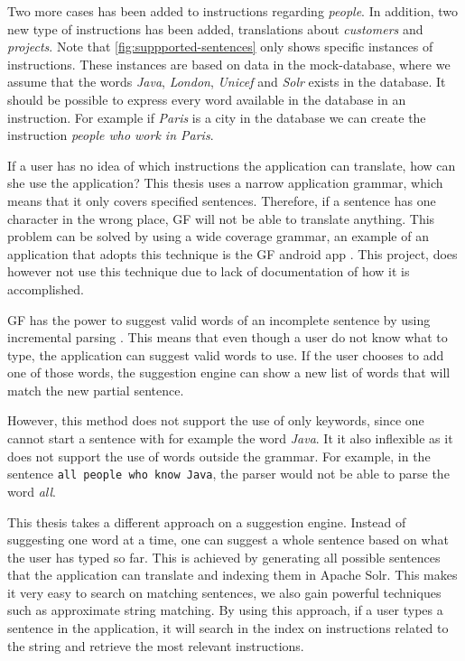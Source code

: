 Two more cases has been added to instructions regarding \emph{people}. In addition, two new type of instructions has been added, translations about \emph{customers} and \emph{projects}. Note that \autoref{fig:suppported-sentences} only shows specific instances of instructions. These instances are based on data in the mock-database, where we assume that the words \emph{Java}, \emph{London}, \emph{Unicef} and \emph{Solr} exists in the database. It should be possible to express every word available in the database in an instruction. For example if \emph{Paris} is a city in the database we can create the instruction \emph{people who work in Paris}.

If a user has no idea of which instructions the application can translate, how can she use the application? This thesis uses a narrow application grammar, which means that it only covers specified sentences. Therefore, if a sentence has one character in the wrong place, GF will not be able to
translate anything. This problem can be solved by using a wide coverage grammar, an example of an application that adopts this technique is the GF android app \cite[p. 41]{angelov2014speech}. This project, does however not use this technique due to lack of documentation of how it is accomplished.

GF has the power to suggest valid words of an incomplete sentence by using incremental parsing \cite{angelov09:incremental-parser}. This means that even though a user do not know what to type, the application can suggest valid words to use. If the user chooses to add one of those words, the suggestion engine can show a new list of words that will match the new partial sentence.

However, this method does not support the use of only keywords, since one cannot start a sentence with for example the word \emph{Java}. It it also inflexible as it does not support the use of words outside the grammar. For example, in the sentence \texttt{all people who know Java}, the parser would not be able to parse the word \emph{all}.

This thesis takes a different approach on a suggestion engine. Instead of suggesting one word at a time, one can suggest a whole sentence based on what the user has typed so far. This is achieved by generating all possible sentences that the application can translate and indexing them in Apache Solr. This makes it very easy to search on matching sentences, we also gain powerful techniques such as approximate string matching. 
\newline
\newline
By using this approach, if a user types a sentence in the application, it will search in the index on instructions related to the string and retrieve the most relevant instructions.

